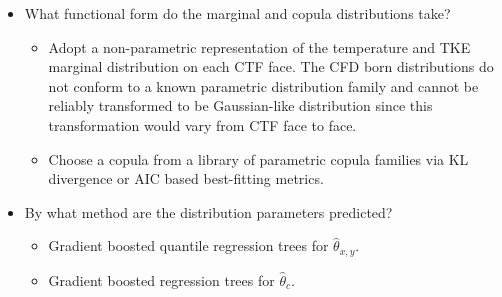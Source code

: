 \documentclass[t, pdftex]{beamer}
\begin{document}
\begin{frame}
{\begin{itemize}
        \item What functional form do the marginal and copula distributions take?
        \begin{itemize}
            \item Adopt a non-parametric representation of the temperature and TKE marginal distribution on each CTF face.  The CFD born distributions do not conform to a known parametric distribution family and cannot be reliably transformed to be Gaussian-like distribution since this transformation would vary from CTF face to face.
            \item Choose a copula from a library of parametric copula families via KL divergence or AIC based best-fitting metrics.
        \end{itemize}        
        \item By what method are the distribution parameters predicted?
        \begin{itemize}
            \item Gradient boosted quantile regression trees for $\hat \theta_{x,y}$.
            \item Gradient boosted regression trees for $\hat \theta_{c}$.
        \end{itemize}
    \end{itemize}
}
\end{frame}

\end{document}
